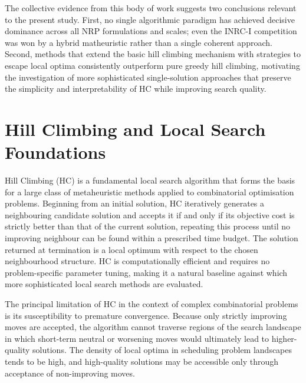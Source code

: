 \documentclass[12pt, a4paper, oneside]{report}
\begin{document}
The collective evidence from this body of work suggests two
conclusions relevant to the present study. First, no single
algorithmic paradigm has achieved decisive dominance across all NRP
formulations and scales; even the INRC-I competition was won by a
hybrid matheuristic rather than a single coherent approach. Second,
methods that extend the basic hill climbing mechanism with strategies
to escape local optima consistently outperform pure greedy hill
climbing, motivating the investigation of more sophisticated
single-solution approaches that preserve the simplicity and
interpretability of HC while improving search quality.

\section{Hill Climbing and Local Search Foundations}
\label{sec:hc}

Hill Climbing (HC) is a fundamental local search algorithm that forms
the basis for a large class of metaheuristic methods applied to
combinatorial optimisation problems. Beginning from an initial
solution, HC iteratively generates a neighbouring candidate solution
and accepts it if and only if its objective cost is strictly better
than that of the current solution, repeating this process until no
improving neighbour can be found within a prescribed time budget. The
solution returned at termination is a local optimum with respect to
the chosen neighbourhood structure. HC is computationally efficient
and requires no problem-specific parameter tuning, making it a
natural baseline against which more sophisticated local search
methods are evaluated.

The principal limitation of HC in the context of complex
combinatorial problems is its susceptibility to premature
convergence. Because only strictly improving moves are accepted, the
algorithm cannot traverse regions of the search landscape in which
short-term neutral or worsening moves would ultimately lead to
higher-quality solutions. The density of local optima in scheduling
problem landscapes tends to be high, and high-quality solutions may
be accessible only through acceptance of non-improving moves.
\end{document}
